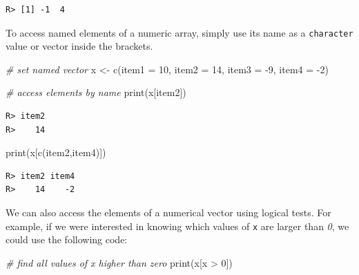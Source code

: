 \documentclass[
  12pt,
]{book}
\newenvironment{Shaded}{\begin{snugshade}}{\end{snugshade}}
\newcommand{\AttributeTok}[1]{\textcolor[rgb]{0.61,0.61,0.61}{#1}}
\newcommand{\CommentTok}[1]{\textcolor[rgb]{0.37,0.37,0.37}{\textit{#1}}}
\newcommand{\DecValTok}[1]{\textcolor[rgb]{0.06,0.06,0.06}{#1}}
\newcommand{\FunctionTok}[1]{\textcolor[rgb]{0,0,0}{#1}}
\newcommand{\NormalTok}[1]{#1}
\newcommand{\OtherTok}[1]{\textcolor[rgb]{0.37,0.37,0.37}{#1}}
\newcommand{\SpecialCharTok}[1]{\textcolor[rgb]{0,0,0}{#1}}
\newcommand{\StringTok}[1]{\textcolor[rgb]{0.5,0.5,0.5}{#1}}
\begin{document}
\begin{verbatim}
R> [1] -1  4
\end{verbatim}

To access named elements of a numeric array, simply use its name as a \texttt{character} value or vector inside the brackets.

\begin{Shaded}
\begin{Highlighting}[]
\CommentTok{\# set named vector}
\NormalTok{x }\OtherTok{\textless{}{-}} \FunctionTok{c}\NormalTok{(}\AttributeTok{item1 =} \DecValTok{10}\NormalTok{, }\AttributeTok{item2 =} \DecValTok{14}\NormalTok{, }\AttributeTok{item3 =} \SpecialCharTok{{-}}\DecValTok{9}\NormalTok{, }\AttributeTok{item4 =} \SpecialCharTok{{-}}\DecValTok{2}\NormalTok{)}

\CommentTok{\# access elements by name}
\FunctionTok{print}\NormalTok{(x[}\StringTok{\textquotesingle{}item2\textquotesingle{}}\NormalTok{])}
\end{Highlighting}
\end{Shaded}

\begin{verbatim}
R> item2 
R>    14
\end{verbatim}

\begin{Shaded}
\begin{Highlighting}[]
\FunctionTok{print}\NormalTok{(x[}\FunctionTok{c}\NormalTok{(}\StringTok{\textquotesingle{}item2\textquotesingle{}}\NormalTok{,}\StringTok{\textquotesingle{}item4\textquotesingle{}}\NormalTok{)])}
\end{Highlighting}
\end{Shaded}

\begin{verbatim}
R> item2 item4 
R>    14    -2
\end{verbatim}

We can also access the elements of a numerical vector using logical tests. For example, if we were interested in knowing which values of \texttt{x} are larger than \emph{0}, we could use the following code:

\begin{Shaded}
\begin{Highlighting}[]
\CommentTok{\# find all values of x higher than zero}
\FunctionTok{print}\NormalTok{(x[x }\SpecialCharTok{\textgreater{}} \DecValTok{0}\NormalTok{])}
\end{Highlighting}
\end{Shaded}
\end{document}
